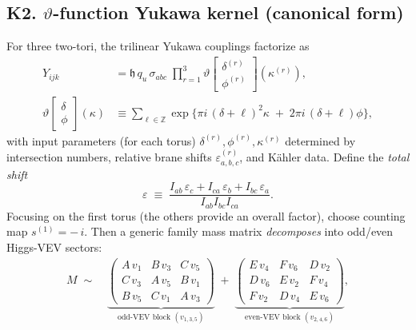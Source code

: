 \documentclass[11pt]{article}
\begin{document}
      \subsection*{K2. $\vartheta$-function Yukawa kernel (canonical form)}
          For three two-tori, the trilinear Yukawa couplings factorize as
          \begin{align}
          Y_{ijk}
          &= \mathfrak h\,q_u\,\sigma_{abc}\;
          \prod_{r=1}^3
          \vartheta\!\left[\begin{smallmatrix}\delta^{(r)}\\[2pt]\phi^{(r)}\end{smallmatrix}\right]\!(\kappa^{(r)}),\\[4pt]
          \vartheta\!\left[\begin{smallmatrix}\delta\\[2pt]\phi\end{smallmatrix}\right]\!(\kappa)
          &\equiv
          \sum_{\ell\in\mathbb Z}
          \exp\!\Big\{\pi i\,(\delta{+}\ell)^2 \kappa\;+\;2\pi i\,(\delta{+}\ell)\phi\Big\},
          \end{align}
          with input parameters (for each torus) $\delta^{(r)},\phi^{(r)},\kappa^{(r)}$ determined by intersection numbers,
          relative brane shifts $\varepsilon^{(r)}_{a,b,c}$, and Kähler data.
          Define the \emph{total shift}
          \[
              \varepsilon\;\equiv\;
              \frac{I_{ab}\,\varepsilon_c+I_{ca}\,\varepsilon_b+I_{bc}\,\varepsilon_a}{I_{ab}I_{bc}I_{ca}}.
          \]
          Focusing on the first torus (the others provide an overall factor), choose counting map $s^{(1)}=-\,i$.
          Then a generic family mass matrix \emph{decomposes} into odd/even Higgs-VEV sectors:
          \begin{align}
          M \;\sim\;
          &\underbrace{\begin{pmatrix}
          A\,v_1 & B\,v_3 & C\,v_5\\
          C\,v_3 & A\,v_5 & B\,v_1\\
          B\,v_5 & C\,v_1 & A\,v_3
          \end{pmatrix}}_{\text{odd-VEV block }(v_{1,3,5})}
          \;+\;
          \underbrace{\begin{pmatrix}
          E\,v_4 & F\,v_6 & D\,v_2\\
          D\,v_6 & E\,v_2 & F\,v_4\\
          F\,v_2 & D\,v_4 & E\,v_6
          \end{pmatrix}}_{\text{even-VEV block }(v_{2,4,6})},
          \end{align}
\end{document}
